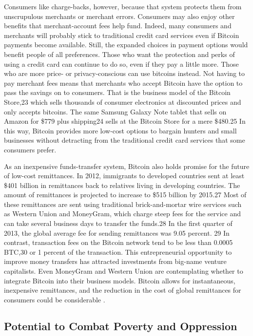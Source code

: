 Consumers like charge-backs, however, because that system
protects them from unscrupulous merchants or merchant errors.
Consumers may also enjoy other benefits that merchant-account
fees help fund. Indeed, many consumers and merchants will probably
stick to traditional credit card services even if Bitcoin payments
become available. Still, the expanded choices in payment
options would benefit people of all preferences.
Those who want the protection and perks of using a credit
card can continue to do so, even if they pay a little more. Those
who are more price- or privacy-conscious can use bitcoins
instead. Not having to pay merchant fees means that merchants
who accept Bitcoin have the option to pass the savings on to consumers.
That is the business model of the Bitcoin Store,23 which
sells thousands of consumer electronics at discounted prices and
only accepts bitcoins. The same Samsung Galaxy Note tablet that
sells on Amazon for \$779 plus shipping24 sells at the Bitcoin Store
for a mere \$480.25 In this way, Bitcoin provides more low-cost
options to bargain hunters and small businesses without detracting
from the traditional credit card services that some consumers
prefer.

As an inexpensive funds-transfer system, Bitcoin also holds
promise for the future of low-cost remittances. In 2012, immigrants
to developed countries sent at least \$401 billion in remittances
back to relatives living in developing countries. The
amount of remittances is projected to increase to \$515 billion
by 2015.27 Most of these remittances are sent using traditional
brick-and-mortar wire services such as Western Union and
MoneyGram, which charge steep fees for the service and can take
several business days to transfer the funds.28 In the first quarter of
2013, the global average fee for sending remittances was 9.05 percent.
29 In contrast, transaction fees on the Bitcoin network tend
to be less than 0.0005 BTC,30 or 1 percent of the transaction. This
entrepreneurial opportunity to improve money transfers has
attracted investments from big-name venture capitalists. Even
MoneyGram and Western Union are contemplating whether to
integrate Bitcoin into their business models. Bitcoin allows for
instantaneous, inexpensive remittances, and the reduction in the
cost of global remittances for consumers could be considerable\cite{bergstra2014bitcoin} \cite{abramowitzstegun}.

\subsection{Potential to Combat Poverty and Oppression}

